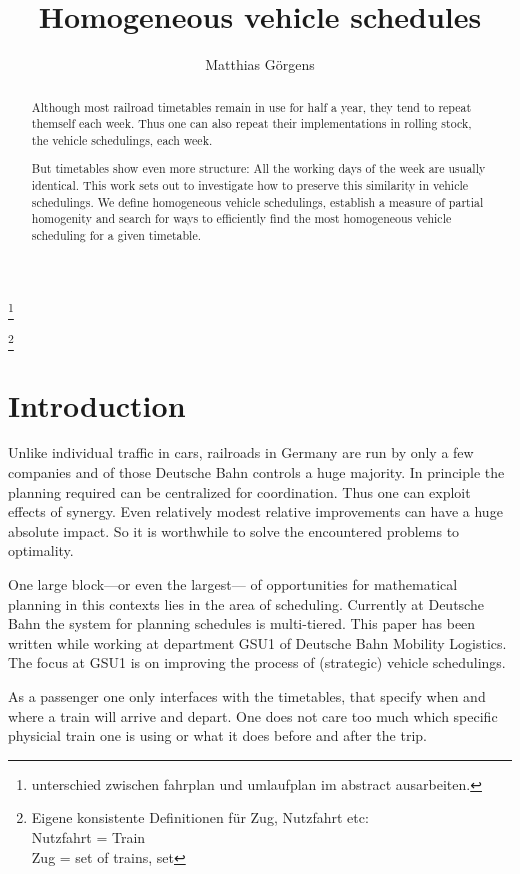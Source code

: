 \documentclass[a4paper]{amsart} %
\author{Matthias Görgens}
\newcommand{\todo}[1]{\footnote{#1}}
\begin{document}
\title{Homogeneous vehicle schedules}

\begin{abstract}
  Although most railroad timetables remain in use for half a
  year, they tend to repeat themself each week.  Thus one can also
  repeat their implementations in rolling stock, the vehicle
  schedulings, each week.

  But timetables show even more structure: All the working days of the
  week are usually identical.  This work sets out to investigate how
  to preserve this similarity in vehicle schedulings.  We define
  homogeneous vehicle schedulings, establish a measure of partial
  homogenity and search for ways to efficiently find the most
  homogeneous vehicle scheduling for a given timetable.
\end{abstract}

\maketitle
\todo{unterschied zwischen fahrplan und umlaufplan im abstract ausarbeiten.}

\todo{Eigene konsistente Definitionen für Zug, Nutzfahrt etc:\\
Nutzfahrt = Train\\
Zug = set of trains, set}

\section{Introduction}
Unlike individual traffic in cars, railroads in Germany are run by
only a few companies and of those Deutsche Bahn controls a huge
majority.  In principle the planning required can be centralized for
coordination.  Thus one can exploit effects of synergy.  Even
relatively modest relative improvements can have a huge absolute
impact.  So it is worthwhile to solve the encountered problems to
optimality.

One large block---or even the largest--- of opportunities for
mathematical planning in this contexts lies in the area of scheduling.
Currently at Deutsche Bahn the system for planning schedules is
multi-tiered.  This paper has been written while working at department
GSU1 of Deutsche Bahn Mobility Logistics.  The focus at GSU1 is on
improving the process of (strategic) vehicle schedulings.

As a passenger one only interfaces with the timetables, that specify
when and where a train will arrive and depart.  One does not care too
much which specific physicial train one is using or what it does
before and after the trip.
\end{document}

